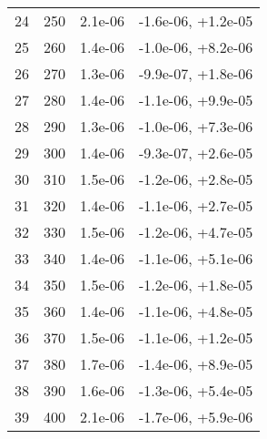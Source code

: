 \begin{table}
\begin{adjustbox}{width=1\textwidth/2}
\begin{tabular}{|c|c|c|c|}
\cline{1-4}
24 & 250 & 2.1e-06 & -1.6e-06, +1.2e-05 \\
\cline{1-4}
25 & 260 & 1.4e-06 & -1.0e-06, +8.2e-06 \\
\cline{1-4}
26 & 270 & 1.3e-06 & -9.9e-07, +1.8e-06 \\
\cline{1-4}
27 & 280 & 1.4e-06 & -1.1e-06, +9.9e-05 \\
\cline{1-4}
28 & 290 & 1.3e-06 & -1.0e-06, +7.3e-06 \\
\cline{1-4}
29 & 300 & 1.4e-06 & -9.3e-07, +2.6e-05 \\
\cline{1-4}
30 & 310 & 1.5e-06 & -1.2e-06, +2.8e-05 \\
\cline{1-4}
31 & 320 & 1.4e-06 & -1.1e-06, +2.7e-05 \\
\cline{1-4}
32 & 330 & 1.5e-06 & -1.2e-06, +4.7e-05 \\
\cline{1-4}
33 & 340 & 1.4e-06 & -1.1e-06, +5.1e-06 \\
\cline{1-4}
34 & 350 & 1.5e-06 & -1.2e-06, +1.8e-05 \\
\cline{1-4}
35 & 360 & 1.4e-06 & -1.1e-06, +4.8e-05 \\
\cline{1-4}
36 & 370 & 1.5e-06 & -1.1e-06, +1.2e-05 \\
\cline{1-4}
37 & 380 & 1.7e-06 & -1.4e-06, +8.9e-05 \\
\cline{1-4}
38 & 390 & 1.6e-06 & -1.3e-06, +5.4e-05 \\
\cline{1-4}
39 & 400 & 2.1e-06 & -1.7e-06, +5.9e-06 \\
\cline{1-4}
\end{tabular}
\end{adjustbox}
\end{table}

